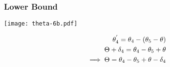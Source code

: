 \subsubsection{Lower Bound}

\begin{minipage}[t]{0.5\textwidth}
\texttt{[image: theta-6b.pdf]}  
\end{minipage}
\begin{minipage}[t]{0.5\textwidth}
\vspace{-1in}
\begin{equation*}
\centering
\begin{aligned}
\theta_4^{'} = \theta_4 - (\theta_5 - \theta)\\
\Theta + \delta_4 = \theta_4 - \theta_5 + \theta\\
\implies \Theta = \theta_4 - \theta_5 + \theta - \delta_4
\end{aligned}
\end{equation*}
\end{minipage}




